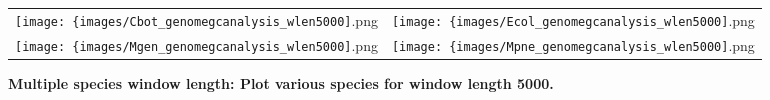 % 
%
\begin{figure}[!h]

 \begin{center}
 
  \begin{tabular}{cc}
   \texttt{[image: \{images/Cbot\_genomegcanalysis\_wlen5000]}.png} &
   \texttt{[image: \{images/Ecol\_genomegcanalysis\_wlen5000]}.png}    \\
   \texttt{[image: \{images/Mgen\_genomegcanalysis\_wlen5000]}.png} &
   \texttt{[image: \{images/Mpne\_genomegcanalysis\_wlen5000]}.png}    \\
  \end{tabular}
  \parbox{0.7\textwidth}{%
   \caption[Multiple species window length: Plot various species for window length 5000.]{%
   \label{fig:Multiple species window length plots}\textbf{Multiple species window length: Plot various species for window length 5000.}
   }%
  }%

 \end{center}
 
\end{figure}
